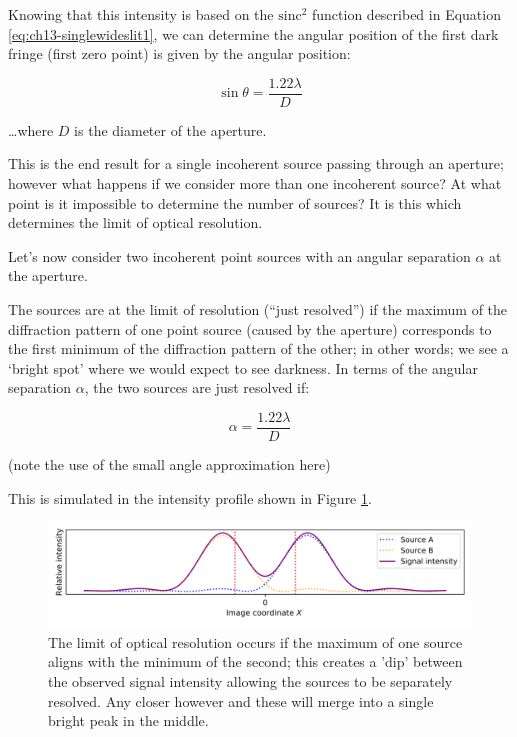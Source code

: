 \documentclass[
]{book}
\begin{document}
Knowing that this intensity is based on the \(\mathrm{sinc}^2\) function described in Equation \eqref{eq:ch13-singlewideslit1}, we can determine the angular position of the first dark fringe (first zero point) is given by the angular position:

\begin{equation}
\sin \theta = \frac{1.22 \lambda}{D}
\end{equation}

\ldots where \(D\) is the diameter of the aperture.

This is the end result for a single incoherent source passing through an aperture; however what happens if we consider more than one incoherent source? At what point is it impossible to determine the number of sources? It is this which determines the limit of optical resolution.

Let's now consider two incoherent point sources with an angular separation \(\alpha\) at the aperture.

The sources are at the limit of resolution (``just resolved'') if the maximum of the diffraction pattern of one point source (caused by the aperture) corresponds to the first minimum of the diffraction pattern of the other; in other words; we see a `bright spot' where we would expect to see darkness. In terms of the angular separation \(\alpha\), the two sources are just resolved if:

\begin{equation}
\alpha = \frac{1.22 \lambda}{D}
\end{equation}

(note the use of the small angle approximation here)

This is simulated in the intensity profile shown in Figure \ref{fig:ch13-opticalreslimit1}.

\begin{figure}

{\centering \includegraphics[width=0.7\linewidth]{visualisations/ch13-opticalresolutionlimit1} 

}

\caption{The limit of optical resolution occurs if the maximum of one source aligns with the minimum of the second; this creates a 'dip' between the observed signal intensity allowing the sources to be separately resolved. Any closer however and these will merge into a single bright peak in the middle.}\label{fig:ch13-opticalreslimit1}
\end{figure}
\end{document}
